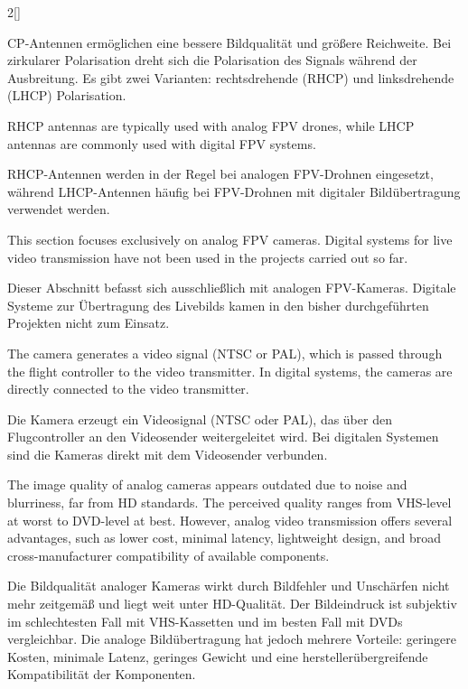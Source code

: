 \begin{paracol}{2}[]
\colger

CP-Antennen ermöglichen eine bessere Bildqualität und größere Reichweite. Bei zirkularer Polarisation dreht sich die Polarisation des Signals während der Ausbreitung. Es gibt zwei Varianten: rechtsdrehende (RHCP) und linksdrehende (LHCP) Polarisation.

\coleng

RHCP antennas are typically used with analog FPV drones, while LHCP antennas are commonly used with digital FPV systems.

\colger

RHCP-Antennen werden in der Regel bei analogen FPV-Drohnen eingesetzt, während LHCP-Antennen häufig bei FPV-Drohnen mit digitaler Bildübertragung verwendet werden.

\colende

\renewcommand{\deutschertitel}{Kamera}
\renewcommand{\englischertitel}{Camera}
\makroabschnitt
\label{AbschnittKamera}

This section focuses exclusively on analog FPV cameras. Digital systems for live video transmission have not been used in the projects carried out so far.

\colger

Dieser Abschnitt befasst sich ausschließlich mit analogen FPV-Kameras. Digitale Systeme zur Übertragung des Livebilds kamen in den bisher durchgeführten Projekten nicht zum Einsatz.

\coleng

The camera generates a video signal (NTSC or PAL), which is passed through the flight controller to the video transmitter. In digital systems, the cameras are directly connected to the video transmitter.

\colger

Die Kamera erzeugt ein Videosignal (NTSC oder PAL), das über den Flugcontroller an den Videosender weitergeleitet wird. Bei digitalen Systemen sind die Kameras direkt mit dem Videosender verbunden.

\coleng

The image quality of analog cameras appears outdated due to noise and blurriness, far from HD standards. The perceived quality ranges from VHS-level at worst to DVD-level at best. However, analog video transmission offers several advantages, such as lower cost, minimal latency, lightweight design, and broad cross-manufacturer compatibility of available components.

\colger

Die Bildqualität analoger Kameras wirkt durch Bildfehler und Unschärfen nicht mehr zeitgemäß und liegt weit unter HD-Qualität. Der Bildeindruck ist subjektiv im schlechtesten Fall mit VHS-Kassetten und im besten Fall mit DVDs vergleichbar. Die analoge Bildübertragung hat jedoch mehrere Vorteile: geringere Kosten, minimale Latenz, geringes Gewicht und eine herstellerübergreifende Kompatibilität der Komponenten.


\end{paracol}
